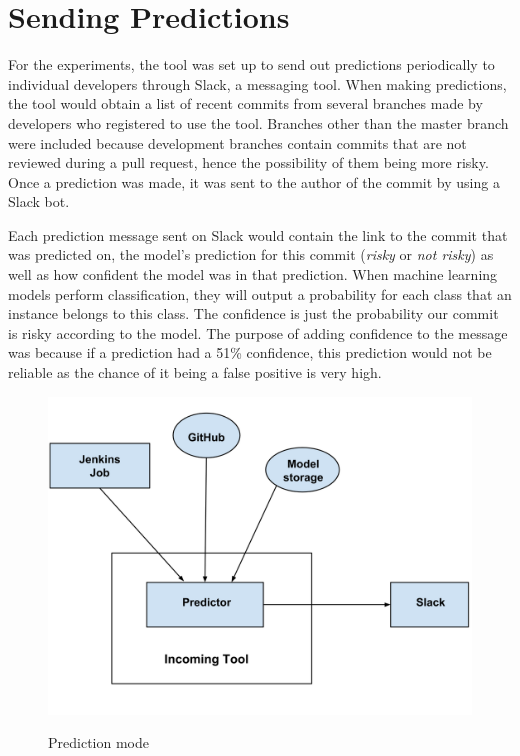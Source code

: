 \documentclass[../main.tex]{subfiles}
\begin{document}
\section{Sending Predictions}

For the experiments, the tool was set up to send out predictions periodically to individual developers through Slack, a messaging tool. When making predictions, the tool would obtain a list of recent commits from several branches made by developers who registered to use the tool. Branches other than the master branch were included because development branches contain commits that are not reviewed during a pull request, hence the possibility of them being more risky. Once a prediction was made, it was sent to the author of the commit by using a Slack bot. 

Each prediction message sent on Slack would contain the link to the commit that was predicted on, the model's prediction for this commit (\textit{risky} or \textit{not risky}) as well as how confident the model was in that prediction. When machine learning models perform classification, they will output a probability for each class that an instance belongs to this class. The confidence is just the probability our commit is risky according to the model. The purpose of adding confidence to the message was because if a prediction had a 51\% confidence, this prediction would not be reliable as the chance of it being a false positive is very high. 

\begin{figure}[H]
\centering
\includegraphics[scale=0.15]{images/Technical_Contribution/incoming_2.png}
\label{fig:incoming2}
\caption{Prediction mode}
\end{figure}
\end{document}
